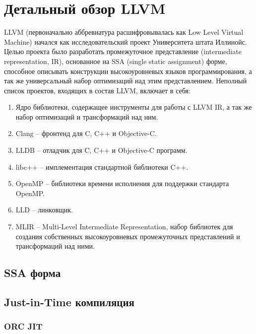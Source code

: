 \clearpage

\section{Детальный обзор LLVM}

LLVM (первоначально аббревиатура расшифровывалась как Low Level Virtual Machine) начался как
исследовательский проект Университета штата Иллинойс. Целью проекта было разработать промежуточное
представление (intermediate representation, IR), основанное на SSA (single static assignment) 
форме, способное описывать конструкции высокоуровневых языков программирования, а так же
универсальный набор оптимизаций над этим представлением. Неполный список проектов, входящих
в состав LLVM, включает в себя:

\begin{enumerate}
\item Ядро библиотеки, содержащее инструменты для работы с LLVM IR, а так же набор
оптимизаций и трансформаций над ним.
\item Clang -- фронтенд для C, C++ и Objective-C.
\item LLDB -- отладчик для C, C++ и Objective-C программ.
\item libc++ -- имплементация стандартной библиотеки C++.
\item OpenMP -- библиотеки времени исполнения для поддержки стандарта OpenMP.
\item LLD -- линковщик.
\item MLIR -- Multi-Level Intermediate Representation, набор библиотек для
создания собственных высокоуровневых промежуточных представлений и трансформаций
над ними. 
\end{enumerate}

\subsection{SSA форма}

\subsection{Just-in-Time компиляция}
\subsubsection{ORC JIT}

